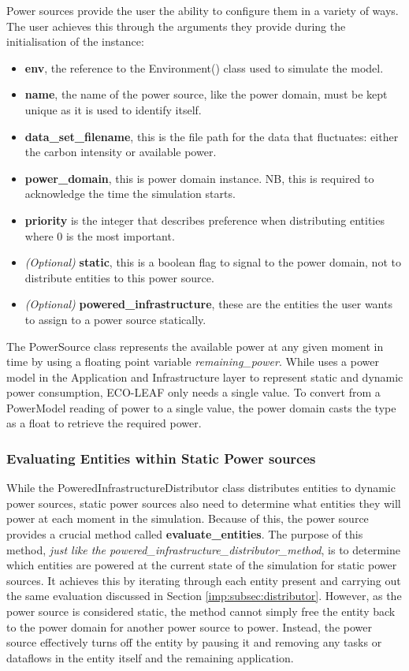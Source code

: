 \documentclass{l4proj}
\begin{document}
Power sources provide the user the ability to configure them in a variety of ways.
The user achieves this through the arguments they provide during the initialisation of the instance:
\begin{itemize}
    \item \textbf{env}, the reference to the Environment() class used to simulate the model.
    \item \textbf{name}, the name of the power source, like the power domain, must be kept unique as it is used to identify itself.
    \item \textbf{data\_set\_filename}, this is the file path for the data that fluctuates: either the carbon intensity or available power.
    \item \textbf{power\_domain}, this is power domain instance. NB, this is required to acknowledge the time the simulation starts.
    \item \textbf{priority} is the integer that describes preference when distributing entities where 0 is the most important.
    \item \textit{(Optional)} \textbf{static}, this is a boolean flag to signal to the power domain, not to distribute entities to this power source.
    \item \textit{(Optional)} \textbf{powered\_infrastructure}, these are the entities the user wants to assign to a power source statically.
\end{itemize}
The PowerSource class represents the available power at any given moment in time by using a floating point variable \textit{remaining\_power}.
While \cite{leaf2021} uses a power model in the Application and Infrastructure layer to represent static and dynamic power consumption, ECO-LEAF only needs a single value.
To convert from a PowerModel reading of power to a single value, the power domain casts the type as a float to retrieve the required power.

\subsubsection{Evaluating Entities within Static Power sources}\label{imp:subsec:static-entities}
While the PoweredInfrastructureDistributor class distributes entities to dynamic power sources, static power sources also need to determine what entities they will power at each moment in the simulation.
Because of this, the power source provides a crucial method called \textbf{evaluate\_entities}.
The purpose of this method, \textit{just like the powered\_infrastructure\_distributor\_method}, is to determine which entities are powered at the current state of the simulation for static power sources.
It achieves this by iterating through each entity present and carrying out the same evaluation discussed in Section \ref{imp:subsec:distributor}.
However, as the power source is considered static, the method cannot simply free the entity back to the power domain for another power source to power.
Instead, the power source effectively turns off the entity by pausing it and removing any tasks or dataflows in the entity itself and the remaining application.
\end{document}
